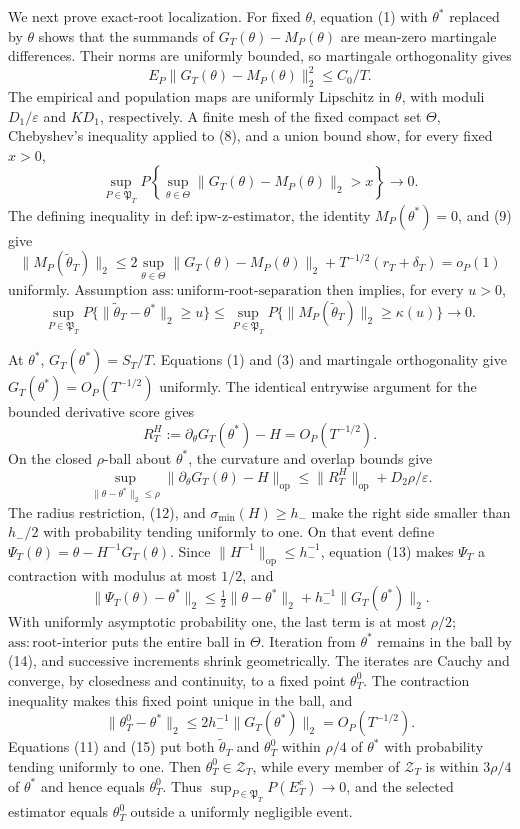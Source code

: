 We next prove exact-root localization.  For fixed \(\theta\), equation (1)
with \(\theta^*\) replaced by \(\theta\) shows that the summands of
\(G_T(\theta)-M_P(\theta)\) are mean-zero martingale differences.  Their
norms are uniformly bounded, so martingale orthogonality gives
\[
 E_P\|G_T(\theta)-M_P(\theta)\|_2^2\le C_0/T.
\tag{8}
\]
The empirical and population maps are uniformly Lipschitz in \(\theta\),
with moduli \(D_1/\varepsilon\) and \(KD_1\), respectively.  A finite mesh
of the fixed compact set \(\Theta\), Chebyshev's inequality applied to (8),
and a union bound show, for every fixed \(x>0\),
\[
 \sup_{P\in\mathfrak P_T}P\!\left\{\sup_{\theta\in\Theta}
 \|G_T(\theta)-M_P(\theta)\|_2>x\right\}\longrightarrow0.
\tag{9}
\]
The defining inequality in \(\mathrm{def:ipw\text{-}z\text{-}estimator}\),
the identity \(M_P(\theta^*)=0\), and (9) give
\[
 \|M_P(\widetilde\theta_T)\|_2
 \le2\sup_{\theta\in\Theta}\|G_T(\theta)-M_P(\theta)\|_2
 +T^{-1/2}(r_T+\delta_T)=o_P(1)
\tag{10}
\]
uniformly.  Assumption \(\mathrm{ass:uniform\text{-}root\text{-}separation}\)
then implies, for every \(u>0\),
\[
 \sup_{P\in\mathfrak P_T}P\{\|\widetilde\theta_T-\theta^*\|_2\ge u\}
 \le\sup_{P\in\mathfrak P_T}P\{\|M_P(\widetilde\theta_T)\|_2
 \ge\kappa(u)\}\longrightarrow0.
\tag{11}
\]

At \(\theta^*\), \(G_T(\theta^*)=S_T/T\).  Equations (1) and (3) and
martingale orthogonality give \(G_T(\theta^*)=O_P(T^{-1/2})\) uniformly.
The identical entrywise argument for the bounded derivative score gives
\[
 R_T^H:=\partial_\theta G_T(\theta^*)-H=O_P(T^{-1/2}).
\tag{12}
\]
On the closed \(\rho\)-ball about \(\theta^*\), the curvature and overlap
bounds give
\[
 \sup_{\|\theta-\theta^*\|_2\le\rho}
 \|\partial_\theta G_T(\theta)-H\|_{\mathrm{op}}
 \le\|R_T^H\|_{\mathrm{op}}+D_2\rho/\varepsilon.
\tag{13}
\]
The radius restriction, (12), and \(\sigma_{\min}(H)\ge h_-\) make the
right side smaller than \(h_-/2\) with probability tending uniformly to
one.  On that event define \(\Psi_T(\theta)=\theta-H^{-1}G_T(\theta)\).
Since \(\|H^{-1}\|_{\mathrm{op}}\le h_-^{-1}\), equation (13) makes
\(\Psi_T\) a contraction with modulus at most \(1/2\), and
\[
 \|\Psi_T(\theta)-\theta^*\|_2
 \le\tfrac12\|\theta-\theta^*\|_2
 +h_-^{-1}\|G_T(\theta^*)\|_2.
\tag{14}
\]
With uniformly asymptotic probability one, the last term is at most
\(\rho/2\); \(\mathrm{ass:root\text{-}interior}\) puts the entire ball in
\(\Theta\).  Iteration from \(\theta^*\) remains in the ball by (14), and
successive increments shrink geometrically.  The iterates are Cauchy and
converge, by closedness and continuity, to a fixed point \(\theta_T^0\).
The contraction inequality makes this fixed point unique in the ball, and
\[
 \|\theta_T^0-\theta^*\|_2
 \le2h_-^{-1}\|G_T(\theta^*)\|_2=O_P(T^{-1/2}).
\tag{15}
\]
Equations (11) and (15) put both \(\widetilde\theta_T\) and
\(\theta_T^0\) within \(\rho/4\) of \(\theta^*\) with probability tending
uniformly to one.  Then \(\theta_T^0\in\mathcal Z_T\), while every member
of \(\mathcal Z_T\) is within \(3\rho/4\) of \(\theta^*\) and hence equals
\(\theta_T^0\).  Thus \(\sup_{P\in\mathfrak P_T}P(E_T^c)\to0\), and the
selected estimator equals \(\theta_T^0\) outside a uniformly negligible
event.

